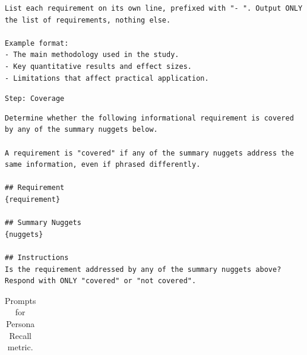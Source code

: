 \begin{table}[h]
\begin{lstlisting}[style=promptstyle,aboveskip=2pt,belowskip=2pt]
List each requirement on its own line, prefixed with "- ". Output ONLY the list of requirements, nothing else.

Example format:
- The main methodology used in the study.
- Key quantitative results and effect sizes.
- Limitations that affect practical application.
\end{lstlisting}
\vspace{-2pt}

\noindent\texttt{Step: Coverage}\dotfill\par
\vspace{-2pt}
\begin{lstlisting}[style=promptstyle,aboveskip=2pt,belowskip=2pt]
Determine whether the following informational requirement is covered by any of the summary nuggets below.

A requirement is "covered" if any of the summary nuggets address the same information, even if phrased differently.

## Requirement
{requirement}

## Summary Nuggets
{nuggets}

## Instructions
Is the requirement addressed by any of the summary nuggets above? Respond with ONLY "covered" or "not covered".
\end{lstlisting}
\vspace{-2pt}

\begin{tabular}{p{\columnwidth}}
\bottomrule
\end{tabular}
\vspace{-6pt}
\caption{Prompts for Persona Recall metric.}\label{tab:ch-7-llm-judge-persona-recall}
\end{table}


